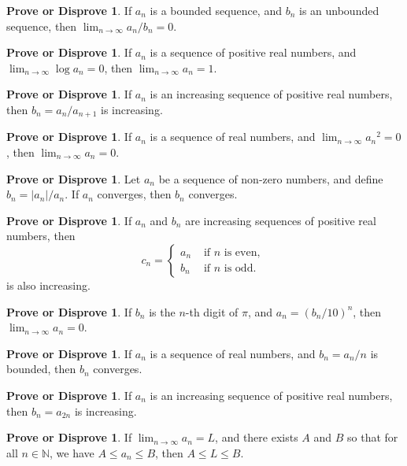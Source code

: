 \documentclass[12pt]{article}
\theoremstyle{definition}
\newtheorem{podsip}[theorem]{Prove or Disprove}
\newcommand{\N}{\mathbb{N}}
\newcommand{\limn}{\displaystyle\lim_{n \to \infty}}
\begin{document}
\begin{podsip} %
If $a_n$ is a bounded sequence, and $b_n$ is an unbounded sequence, then $\limn a_n/b_n = 0$.
\end{podsip}

\begin{podsip} %
If $a_n$ is a sequence of positive real numbers, and $\limn \log a_n = 0$, then $\limn a_n = 1$.
\end{podsip}

\begin{podsip} %
If $a_n$ is an increasing sequence of positive real numbers, then $b_n = a_{n}/a_{n+1}$ is increasing.
\end{podsip}

\begin{podsip} %
If $a_n$ is a sequence of real numbers, and $\limn {a_n}^2 = 0$, then $\limn a_n = 0$.
\end{podsip}

\begin{podsip} %
Let $a_n$ be a sequence of non-zero numbers, and define $b_n = |a_n| / a_n$.  If $a_n$ converges, then $b_n$ converges.
\end{podsip}

\begin{podsip} %
If $a_n$ and $b_n$ are increasing sequences of positive real numbers, then
$$
c_n = \begin{cases}
a_{n} & \mbox{ if $n$ is even, } \\
b_{n} & \mbox{ if $n$ is odd. }
\end{cases}
$$
is also increasing.
\end{podsip}

\begin{podsip} %
If $b_n$ is the $n$-th digit of $\pi$, and $a_n = (b_n/10)^n$, then $\limn a_n = 0$.
\end{podsip}

\begin{podsip} %
  If $a_n$ is a sequence of real numbers, and $b_n = a_n/n$ is
  bounded, then $b_n$ converges.
\end{podsip}

\begin{podsip} %
If $a_n$ is an increasing sequence of positive real numbers, then $b_n = a_{2n}$ is increasing.
\end{podsip}

\begin{podsip} %
If $\limn a_n = L$, and there exists $A$ and $B$ so that for all $n \in \N$, we have $A \leq a_n \leq B$, then $A \leq L \leq B$.
\end{podsip}
\end{document}
